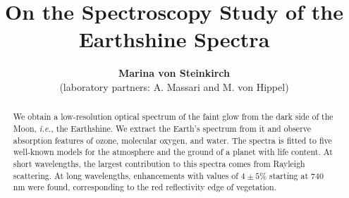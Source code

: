 \documentclass[manuscript]{aastex}
\newcommand{\ie}{{\it i.e., }}
\begin{document}
\title{On the Spectroscopy Study of the Earthshine Spectra}
\author{{\bf Marina von Steinkirch} \\ (laboratory partners: A. Massari and M. von Hippel)}
\received{: \today}
\accepted{: \today}



\begin{abstract}
We obtain a low-resolution optical spectrum of the faint glow from the dark side
of the Moon, \ie the Earthshine.  We extract  the 
Earth's spectrum from it and observe absorption features of ozone, molecular oxygen, and
water. The  spectra is fitted to five
well-known models for the atmosphere and the ground of a planet with life
content. At short wavelengths, the largest
contribution to this spectra comes from Rayleigh scattering. At long
wavelengths, enhancements  with values of $4\pm 5\%$ starting at 740 nm were
found, corresponding to the red
reflectivity edge of vegetation. 

\end{abstract}










%


\end{document}
